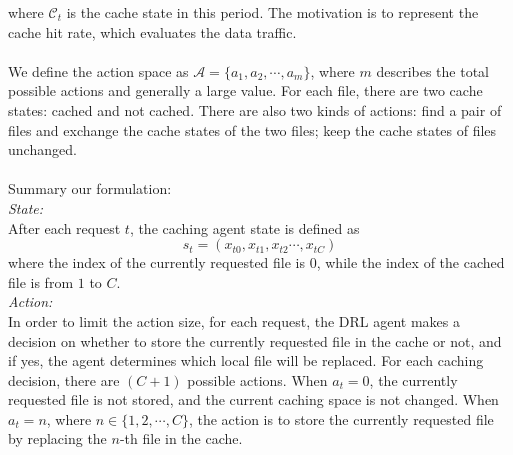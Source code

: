 \documentclass[a4paper,12pt]{article}
\begin{document}
where $\mathcal{C}_t$ is the cache state in this period. The motivation is to represent the cache hit rate, which evaluates the data traffic.\\~\\
 We define the action space as $\mathcal{A}=\{a_1,a_2,\cdots,a_m\}$, where $m$ describes the total possible actions and generally a large value. For each file, there are two cache states: cached and not cached. There are also two kinds of actions: find a pair of files and exchange the cache states of the two files; keep the cache states of files unchanged.\\~\\
 Summary our formulation:\\
\emph{State:}\\
After each request $t$, the caching agent state is defined as
$$s_t=\left(x_{t0},x_{t1},x_{t2}\cdots,x_{tC}\right)$$
where the index of the currently requested file is $0$, while the index of the cached file is from $1$ to $C$.\\
\emph{Action:}\\
In order to limit the action size, for each request, the DRL agent makes a decision on whether to store the currently requested file in the cache or not, and if yes, the agent determines which local file will be replaced. For each caching decision, there are $(C+1)$ possible actions. When $a_t=0$, the currently requested file is not stored, and the current caching space is not changed. When $a_t=n$, where $n\in\{1,2,\cdots,C\}$, the action is to store the currently requested file by replacing the $n$-th file in the cache.
\end{document}
